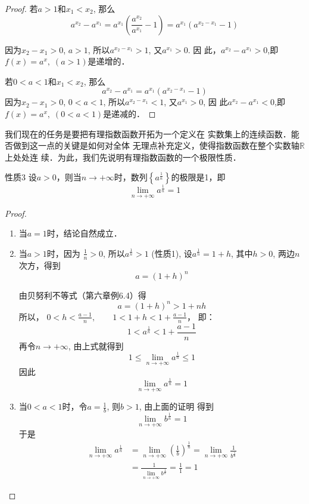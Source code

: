 \begin{proof}
  若$a>1$和$x_1<x_2$, 那么
\[a^{x_2}-a^{x_1}=a^{x_1}\left(\frac{a^{x_2}}{a^{x_1}}-1\right)=a^{x_1}\left(a^{x_2-x_1}-1\right)\]
  
因为$x_2-x_1>0$, $a>1$, 所以$a^{x_2-x_1}>1$, 又$a^{x_1}>0$. 因
此，$a^{x_2}-a^{x_1}>0$,即$f(x)=a^x,\; (a>1)$是递增的．

若$0<a<1$和$x_1<x_2$, 那么
\[a^{x_2}-a^{x_1}=a^{x_1}\left(a^{x_2-x_1}-1\right)\]
因为$x_2-x_1>0$, $0<a<1$, 所以$a^{x_2-x_1}<1$, 又$a^{x_1}>0$, 因
此$a^{x_2}-a^{x_1}<0$,即$f(x)=a^x,\; (0<a<1)$是递减的．
\end{proof}

我们现在的任务是要把有理指数函数开拓为一个定义在
实数集上的连续函数．能否做到这一点的关键是如何对全体
无理点补充定义，使得指数函数在整个实数轴$\mathbb{R}$上处处连
续．为此，我们先说明有理指数函数的一个极限性质．


\begin{blk}{性质3}
  设$a>0$，则当$n\to +\infty$时，数列$\left\{a^{\tfrac{1}{n}}\right\}$的极限是1，即
  \[\lim_{n\to +\infty}a^{\tfrac{1}{n}}=1\]
\end{blk}

\begin{proof}
\begin{enumerate}
  \item 当$a=1$时，结论自然成立．
  \item 当$a>1$时，因为
  $\frac{1}{n}>0$, 所以$a^{\tfrac{1}{n}}>1$ (性质1),
  设$a^{\tfrac{1}{n}}=1+h$, 其中$h>0$, 两边$n$次方，得到
 \[ a=(1+h)^n\]
 
 由贝努利不等式（第六章例6.4）得
\[  a=(1+h)^n>1+nh\]
  所以，
$  0<h<\frac{a-1}{n},\qquad 1<1+h<1+\frac{a-1}{n}$，
  即：
\[1<a^{\tfrac{1}{n}}<1+\frac{a-1}{n}\]  
  再令$n\to +\infty$, 由上式就得到
\[1\le \lim_{n\to +\infty}a^{\tfrac{1}{n}}\le 1 \]
  因此\[\lim_{n\to +\infty}a^{\tfrac{1}{n}}=1\]
  \item 当$0<a<1$时，令$a=\frac{1}{b}$, 则$b>1$, 由上面的证明
  得到\[\lim_{n\to +\infty}b^{\tfrac{1}{n}}=1\]
于是
\[\begin{split}
  \lim_{n\to +\infty}a^{\tfrac{1}{n}}&=\lim_{n\to +\infty}\left(\frac{1}{b}\right)^{\tfrac{1}{n}}=\lim_{n\to +\infty}\frac{1}{b^{\tfrac{1}{n}}}\\
  &=\frac{1}{\displaystyle\lim_{n\to +\infty}b^{\tfrac{1}{n}}}=\frac{1}{1}=1
\end{split}\]
\end{enumerate} 
\end{proof}

